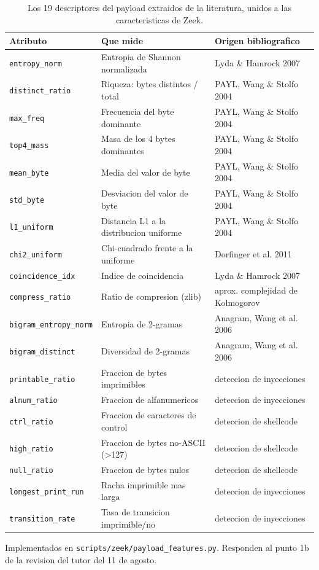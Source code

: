 \begin{table}[htbp]
  \centering
  \caption{Los 19 descriptores del payload extraidos de la literatura, unidos a las caracteristicas de Zeek.}
  \label{tab:descriptores}
  \small
  \begin{tabular}{lp{}p{}}
    \toprule
    \textbf{Atributo} & \textbf{Que mide} & \textbf{Origen bibliografico} \\
    \midrule
    \texttt{entropy\_norm} & Entropia de Shannon normalizada & Lyda \& Hamrock 2007 \\
    \texttt{distinct\_ratio} & Riqueza: bytes distintos / total & PAYL, Wang \& Stolfo 2004 \\
    \texttt{max\_freq} & Frecuencia del byte dominante & PAYL, Wang \& Stolfo 2004 \\
    \texttt{top4\_mass} & Masa de los 4 bytes dominantes & PAYL, Wang \& Stolfo 2004 \\
    \texttt{mean\_byte} & Media del valor de byte & PAYL, Wang \& Stolfo 2004 \\
    \texttt{std\_byte} & Desviacion del valor de byte & PAYL, Wang \& Stolfo 2004 \\
    \texttt{l1\_uniform} & Distancia L1 a la distribucion uniforme & PAYL, Wang \& Stolfo 2004 \\
    \texttt{chi2\_uniform} & Chi-cuadrado frente a la uniforme & Dorfinger et al. 2011 \\
    \texttt{coincidence\_idx} & Indice de coincidencia & Lyda \& Hamrock 2007 \\
    \texttt{compress\_ratio} & Ratio de compresion (zlib) & aprox. complejidad de Kolmogorov \\
    \texttt{bigram\_entropy\_norm} & Entropia de 2-gramas & Anagram, Wang et al. 2006 \\
    \texttt{bigram\_distinct} & Diversidad de 2-gramas & Anagram, Wang et al. 2006 \\
    \texttt{printable\_ratio} & Fraccion de bytes imprimibles & deteccion de inyecciones \\
    \texttt{alnum\_ratio} & Fraccion de alfanumericos & deteccion de inyecciones \\
    \texttt{ctrl\_ratio} & Fraccion de caracteres de control & deteccion de shellcode \\
    \texttt{high\_ratio} & Fraccion de bytes no-ASCII (>127) & deteccion de shellcode \\
    \texttt{null\_ratio} & Fraccion de bytes nulos & deteccion de shellcode \\
    \texttt{longest\_print\_run} & Racha imprimible mas larga & deteccion de inyecciones \\
    \texttt{transition\_rate} & Tasa de transicion imprimible/no & deteccion de inyecciones \\
    \bottomrule
  \end{tabular}
  \par\smallskip\footnotesize{Implementados en \texttt{scripts/zeek/payload\_features.py}. Responden al punto 1b de la revision del tutor del 11 de agosto.}
\end{table}
